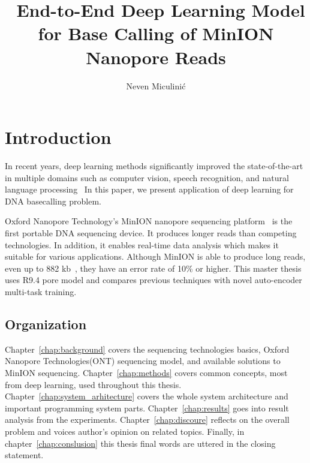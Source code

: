 \documentclass[times, utf8, diplomski, english]{fer}
\begin{document}
\title{ End-to-End Deep Learning Model for Base Calling of MinION Nanopore Reads}
\author{Neven Miculinić}
\maketitle
 



\tableofcontents
\listoffigures

\chapter{Introduction}
\label{chap:Introduction}
In recent years, deep learning methods significantly improved the state-of-the-art in multiple domains such as computer vision, speech recognition, and natural language processing~\citep{LeCun:1998:CNI:303568.303704, NIPS2012_4824}
In this paper, we present application of deep learning for DNA basecalling problem.

Oxford Nanopore Technology's MinION nanopore sequencing platform~\cite{mikheyev2014first} is the first portable DNA sequencing device. It produces longer reads than competing technologies. In addition, it enables real-time data analysis which makes it suitable for various applications.
Although MinION is able to produce long reads, even up to 882 kb~\cite{loman1-100k,loman2-800k}, they have an error rate of 10\% or higher. This master thesis uses R9.4 pore model and compares previous techniques with novel auto-encoder multi-task training. 

\section{Organization}
Chapter~\ref{chap:background} covers the sequencing technologies basics, Oxford Nanopore Technologies(ONT) sequencing model, and available solutions to MinION sequencing. 
Chapter~\ref{chap:methods} covers common concepts, most from deep learning, used throughout this thesis. 
Chapter~\ref{chap:system_arhitecture} covers the whole system architecture and important programming system parts. 
Chapter~\ref{chap:results} goes into result analysis from the experiments.
Chapter~\ref{chap:discoure} reflects on the overall problem and voices author's opinion on related topics.
Finally, in chapter~\ref{chap:conslusion} this thesis final words are uttered in the closing statement. 
\end{document}

